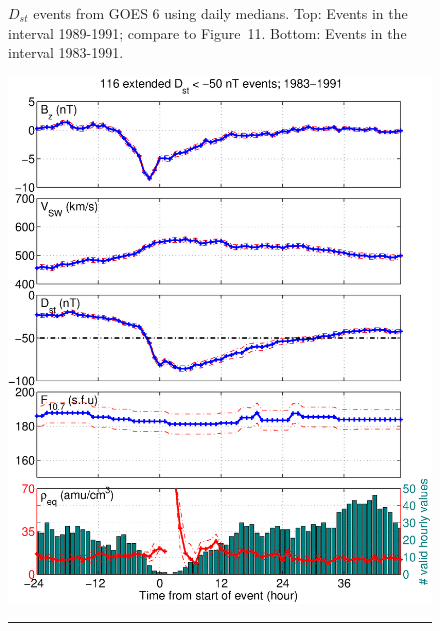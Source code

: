 \documentclass[draft,linenumbers]{agujournal}
\begin{document}
\begin{figure}[h]
	\caption{$D_{st}$ events from GOES 6 using daily medians. Top: Events in the interval 1989-1991; compare to \citet{Takahashi2010} Figure~11. Bottom: Events in the interval 1983-1991.}
	\label{fig:DailyAveragedDstEvents}
\end{figure}

\clearpage

\begin{figure}[tp!]
	\centering
	\includegraphics[scale=0.40]{UsedFigures/2016SW001507R-p04a.eps}
	\\
	\rule[1ex]{5cm}{1pt}
	\\

\end{figure}
\end{document}
